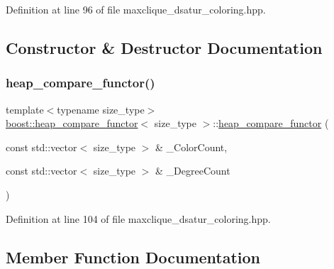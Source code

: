 Definition at line 96 of file maxclique\+\_\+dsatur\+\_\+coloring.\+hpp.



\subsection{Constructor \& Destructor Documentation}
\mbox{\label{structboost_1_1heap__compare__functor_a22d21e8d1f0edb76384dfccac7395791}} 
\subsubsection{\texorpdfstring{heap\+\_\+compare\+\_\+functor()}{heap\_compare\_functor()}}
{\footnotesize\ttfamily template$<$typename size\+\_\+type$>$ \\
\hyperlink{structboost_1_1heap__compare__functor}{boost\+::heap\+\_\+compare\+\_\+functor}$<$ size\+\_\+type $>$\+::\hyperlink{structboost_1_1heap__compare__functor}{heap\+\_\+compare\+\_\+functor} (\begin{DoxyParamCaption}\item[{const std\+::vector$<$ size\+\_\+type $>$ \&}]{\+\_\+\+Color\+Count,  }\item[{const std\+::vector$<$ size\+\_\+type $>$ \&}]{\+\_\+\+Degree\+Count }\end{DoxyParamCaption})\hspace{0.3cm}{\ttfamily [inline]}}



Definition at line 104 of file maxclique\+\_\+dsatur\+\_\+coloring.\+hpp.



\subsection{Member Function Documentation}
\mbox{\label{structboost_1_1heap__compare__functor_afbbfb062a71b1f7f10ec0d39ee438e88}} 
